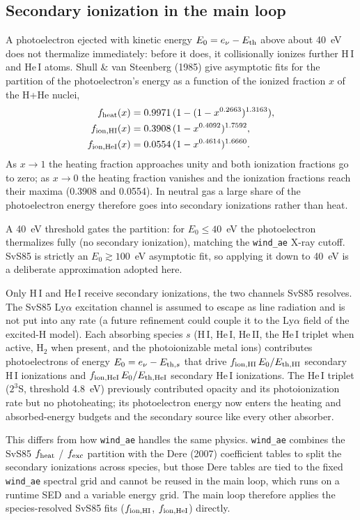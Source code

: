 \documentclass[english,a4paper]{my_memo}
\newcommand{\code}[1]{\texttt{#1}}
\begin{document}
\subsection{Secondary ionization in the main loop}\label{sec:secion}
A photoelectron ejected with kinetic energy $E_0 = e_\nu - E_{\rm th}$ above
about 40~eV does not thermalize immediately: before it does, it collisionally
ionizes further H\,I and He\,I atoms. Shull \& van Steenberg (1985) give
asymptotic fits for the partition of the photoelectron's energy as a function
of the ionized fraction $x$ of the H+He nuclei,
\begin{align}
  f_{\rm heat}(x)    &= 0.9971\,(1 - (1 - x^{0.2663})^{1.3163}), \\
  f_{\rm ion,HI}(x)  &= 0.3908\,(1 - x^{0.4092})^{1.7592}, \\
  f_{\rm ion,HeI}(x) &= 0.0554\,(1 - x^{0.4614})^{1.6660}.
\end{align}
As $x\to1$ the heating fraction approaches unity and both ionization fractions
go to zero; as $x\to0$ the heating fraction vanishes and the ionization
fractions reach their maxima (0.3908 and 0.0554). In neutral gas a large share
of the photoelectron energy therefore goes into secondary ionizations rather
than heat.

A 40~eV threshold gates the partition: for $E_0\le40$~eV the photoelectron
thermalizes fully (no secondary ionization), matching the \code{wind\_ae}
X-ray cutoff. SvS85 is strictly an $E_0\gtrsim100$~eV asymptotic fit, so
applying it down to 40~eV is a deliberate approximation adopted here.

Only H\,I and He\,I receive secondary ionizations, the two channels SvS85
resolves. The SvS85 Ly$\alpha$ excitation channel is assumed to escape as line
radiation and is not put into any rate (a future refinement could couple it to
the Ly$\alpha$ field of the excited-H model). Each absorbing species $s$
(H\,I, He\,I, He\,II, the He\,I triplet when active, H$_2$ when present, and
the photoionizable metal ions)
contributes photoelectrons of energy $E_0 = e_\nu - E_{{\rm th},s}$ that drive
$f_{\rm ion,HI}\,E_0/E_{\rm th,HI}$ secondary H\,I ionizations and
$f_{\rm ion,HeI}\,E_0/E_{\rm th,HeI}$ secondary He\,I ionizations. The He\,I
triplet ($2^3$S, threshold 4.8~eV) previously contributed opacity and its
photoionization rate but no photoheating; its photoelectron energy now enters
the heating and absorbed-energy budgets and the secondary source like every
other absorber.

This differs from how \code{wind\_ae} handles the same physics.
\code{wind\_ae} combines the SvS85 $f_{\rm heat}$ / $f_{\rm exc}$ partition
with the Dere (2007) coefficient tables to split the secondary ionizations
across species, but those Dere tables are tied to the fixed \code{wind\_ae}
spectral grid and cannot be reused in the main loop, which runs on a runtime
SED and a variable energy grid. The main loop therefore applies the
species-resolved SvS85 fits ($f_{\rm ion,HI}$, $f_{\rm ion,HeI}$) directly.
\end{document}

